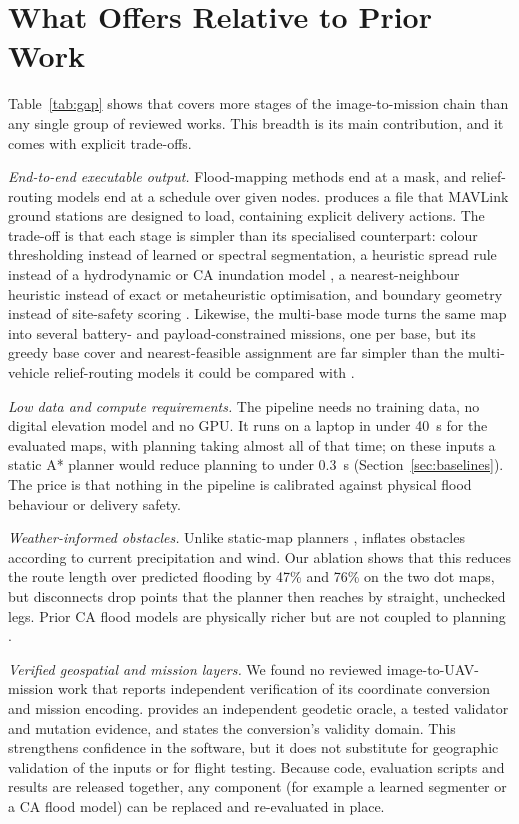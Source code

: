 \section{What \adapt{} Offers Relative to Prior Work}
\label{sec:compare}

Table~\ref{tab:gap} shows that \adapt{} covers more stages of the image-to-mission chain than any single group of reviewed works. This breadth is its main contribution, and it comes with explicit trade-offs.

\emph{End-to-end executable output.} Flood-mapping methods \cite{twele2016sentinel,gebrehiwot2019deep,simantiris2024unsupervised} end at a mask, and relief-routing models \cite{rabta2018drone,dong2026path} end at a schedule over given nodes. \adapt{} produces a file that MAVLink ground stations are designed to load, containing explicit delivery actions. The trade-off is that each stage is simpler than its specialised counterpart: colour thresholding instead of learned or spectral segmentation, a heuristic spread rule instead of a hydrodynamic or CA inundation model \cite{jamali2019cellular}, a nearest-neighbour heuristic instead of exact or metaheuristic optimisation, and boundary geometry instead of site-safety scoring \cite{patterson2014timely}. Likewise, the multi-base mode turns the same map into several battery- and payload-constrained missions, one per base, but its greedy base cover and nearest-feasible assignment are far simpler than the multi-vehicle relief-routing models it could be compared with \cite{rabta2018drone,dong2026path}.

\emph{Low data and compute requirements.} The pipeline needs no training data, no digital elevation model and no GPU. It runs on a laptop in under 40~s for the evaluated maps, with planning taking almost all of that time; on these inputs a static A* planner would reduce planning to under 0.3~s (Section~\ref{sec:baselines}). The price is that nothing in the pipeline is calibrated against physical flood behaviour or delivery safety.

\emph{Weather-informed obstacles.} Unlike static-map planners \cite{aggarwal2020path}, \adapt{} inflates obstacles according to current precipitation and wind. Our ablation shows that this reduces the route length over predicted flooding by 47\% and 76\% on the two dot maps, but disconnects drop points that the planner then reaches by straight, unchecked legs. Prior CA flood models are physically richer but are not coupled to planning \cite{ghimire2013formulation,guidolin2016weighted}.

\emph{Verified geospatial and mission layers.} We found no reviewed image-to-UAV-mission work that reports independent verification of its coordinate conversion and mission encoding. \adapt{} provides an independent geodetic oracle, a tested validator and mutation evidence, and states the conversion's validity domain. This strengthens confidence in the software, but it does not substitute for geographic validation of the inputs or for flight testing. Because code, evaluation scripts and results are released together, any component (for example a learned segmenter or a CA flood model) can be replaced and re-evaluated in place.
